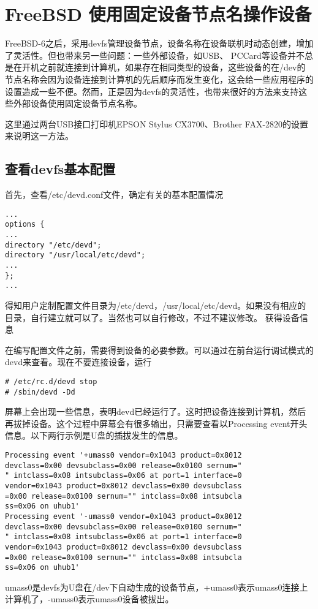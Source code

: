 \section{FreeBSD 使用固定设备节点名操作设备}

FreeBSD-6之后，采用devfs管理设备节点，设备名称在设备联机时动态创建，增加了灵活性。但也带来另一些问题：一些外部设备，如USB、 PCCard等设备并不总是在开机之前就连接到计算机，如果存在相同类型的设备，这些设备的在/dev的节点名称会因为设备连接到计算机的先后顺序而发生变化，这会给一些应用程序的设置造成一些不便。然而，正是因为devfs的灵活性，也带来很好的方法来支持这些外部设备使用固定设备节点名称。

这里通过两台USB接口打印机EPSON Stylus CX3700、Brother FAX-2820的设置来说明这一方法。

\subsection{查看devfs基本配置}

首先，查看/etc/devd.conf文件，确定有关的基本配置情况
\begin{lstlisting}
...
options {
...
directory "/etc/devd";
directory "/usr/local/etc/devd";
...
};
...
\end{lstlisting}
得知用户定制配置文件目录为/etc/devd，/usr/local/etc/devd。如果没有相应的目录，自行建立就可以了。当然也可以自行修改，不过不建议修改。
获得设备信息

在编写配置文件之前，需要得到设备的必要参数。可以通过在前台运行调试模式的devd来查看。现在不要连接设备，运行
\begin{lstlisting}
# /etc/rc.d/devd stop
# /sbin/devd -Dd
\end{lstlisting}
屏幕上会出现一些信息，表明devd已经运行了。这时把设备连接到计算机，然后再拔掉设备。这个过程中屏幕会有很多输出，只需要查看以Processing event开头信息。以下两行示例是U盘的插拔发生的信息。
\begin{lstlisting}
Processing event '+umass0 vendor=0x1043 product=0x8012
devclass=0x00 devsubclass=0x00 release=0x0100 sernum="
" intclass=0x08 intsubclass=0x06 at port=1 interface=0
vendor=0x1043 product=0x8012 devclass=0x00 devsubclass
=0x00 release=0x0100 sernum="" intclass=0x08 intsubcla
ss=0x06 on uhub1'
Processing event '-umass0 vendor=0x1043 product=0x8012
devclass=0x00 devsubclass=0x00 release=0x0100 sernum="
" intclass=0x08 intsubclass=0x06 at port=1 interface=0 
vendor=0x1043 product=0x8012 devclass=0x00 devsubclass
=0x00 release=0x0100 sernum="" intclass=0x08 intsubcla
ss=0x06 on uhub1'
\end{lstlisting}
umass0是devfs为U盘在/dev下自动生成的设备节点，+umass0表示umass0连接上计算机了，-umass0表示umass0设备被拔出。

